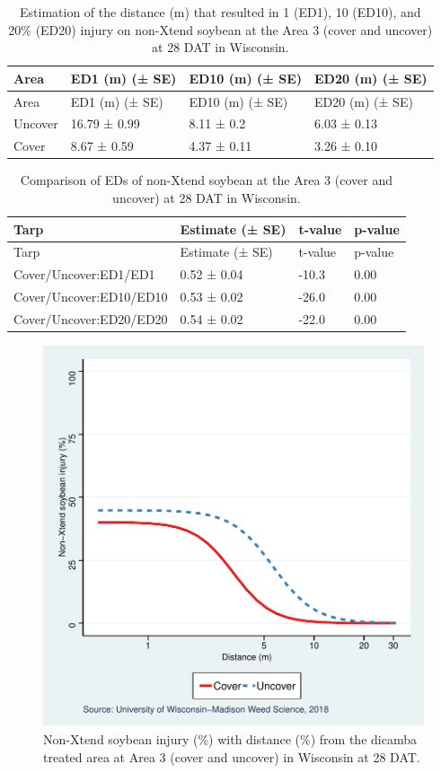 \documentclass[]{article}
\begin{document}
\begin{longtable}[]{@{}llll@{}}
\caption{Estimation of the distance (m) that resulted in 1 (ED1), 10
(ED10), and 20\% (ED20) injury on non-Xtend soybean at the Area 3 (cover
and uncover) at 28 DAT in Wisconsin.}\tabularnewline
\toprule
Area & ED1 (m) (± SE) & ED10 (m) (± SE) & ED20 (m) (± SE)\tabularnewline
\midrule
\endfirsthead
\toprule
Area & ED1 (m) (± SE) & ED10 (m) (± SE) & ED20 (m) (± SE)\tabularnewline
\midrule
\endhead
Uncover & 16.79 ± 0.99 & 8.11 ± 0.2 & 6.03 ± 0.13\tabularnewline
Cover & 8.67 ± 0.59 & 4.37 ± 0.11 & 3.26 ± 0.10\tabularnewline
\bottomrule
\end{longtable}

\begin{longtable}[]{@{}llll@{}}
\caption{Comparison of EDs of non-Xtend soybean at the Area 3 (cover and
uncover) at 28 DAT in Wisconsin.}\tabularnewline
\toprule
Tarp & Estimate (± SE) & t-value & p-value\tabularnewline
\midrule
\endfirsthead
\toprule
Tarp & Estimate (± SE) & t-value & p-value\tabularnewline
\midrule
\endhead
Cover/Uncover:ED1/ED1 & 0.52 ± 0.04 & -10.3 & 0.00\tabularnewline
Cover/Uncover:ED10/ED10 & 0.53 ± 0.02 & -26.0 & 0.00\tabularnewline
Cover/Uncover:ED20/ED20 & 0.54 ± 0.02 & -22.0 & 0.00\tabularnewline
\bottomrule
\end{longtable}

\begin{figure}
\centering
\includegraphics{Report_files/figure-latex/unnamed-chunk-103-1.pdf}
\caption{Non-Xtend soybean injury (\%) with distance (\%) from the
dicamba treated area at Area 3 (cover and uncover) in Wisconsin at 28
DAT.}
\end{figure}
\end{document}

